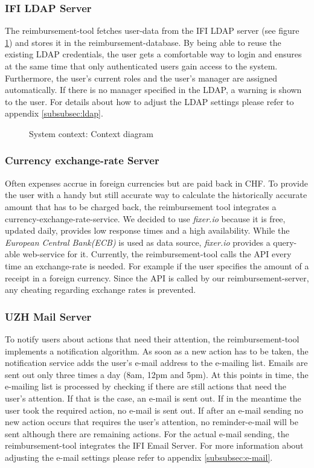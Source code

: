 \subsubsection{IFI LDAP Server}
The reimbursement-tool fetches user-data from the IFI LDAP server (see figure \ref{fig:context-diagram}) and stores it in the reimbursement-database. By being able to reuse the existing LDAP credentials, the user gets a comfortable way to login and ensures at the same time that only authenticated users gain access to the system. Furthermore, the user's current roles and the user's manager are assigned automatically. If there is no manager specified in the LDAP, a warning is shown to the user. For details about how to adjust the LDAP settings please refer to appendix \ref{subsubsec:ldap}.

\begin{figure}[H]
	\centering
	\caption{System context: Context diagram}
	\label{fig:context-diagram}
\end{figure}

\subsubsection{Currency exchange-rate Server}
Often expenses accrue in foreign currencies but are paid back in CHF. To provide the user with a handy but still accurate way to calculate the historically accurate amount that has to be charged back, the reimbursement tool integrates a currency-exchange-rate-service. We decided to use \textit{fixer.io} \cite{fixer} because it is free, updated daily, provides low response times and a high availability. While the \textit{European Central Bank(ECB)}\cite{ecb} is used as data source, \textit{fixer.io} provides a query-able web-service for it. Currently, the reimbursement-tool calls the API every time an exchange-rate is needed. For example if the user specifies the amount of a receipt in a foreign currency. Since the API is called by our reimbursement-server, any cheating regarding exchange rates is prevented.

\subsubsection{UZH Mail Server}
To notify users about actions that need their attention, the reimbursement-tool implements a notification algorithm. As soon as a new action has to be taken, the notification service adds the user's e-mail address to the e-mailing list. Emails are sent out only three times a day (8am, 12pm and 5pm). At this points in time, the e-mailing list is processed by checking if there are still actions that need the user's attention. If that is the case, an e-mail is sent out. If in the meantime the user took the required action, no e-mail is sent out. If after an e-mail sending no new action occurs that requires the user's attention, no reminder-e-mail will be sent although there are remaining actions. For the actual e-mail sending, the reimbursement-tool integrates the IFI Email Server. For more information about adjusting the e-mail settings please refer to appendix \ref{subsubsec:e-mail}.

